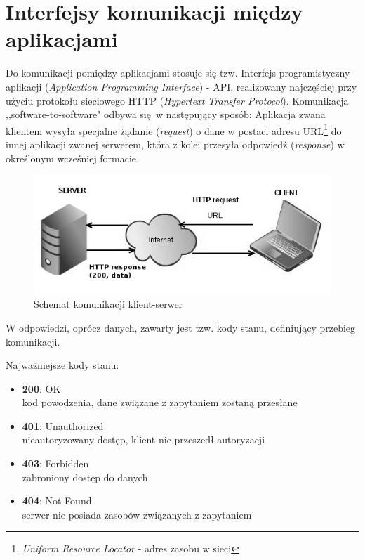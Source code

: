 \section{Interfejsy komunikacji między aplikacjami}
Do komunikacji pomiędzy aplikacjami stosuje się tzw. Interfejs programistyczny aplikacji (\emph{Application Programming Interface}) - API, realizowany najczęściej przy użyciu protokołu sieciowego HTTP (\emph{Hypertext Transfer Protocol}).
Komunikacja ,,software-to-software" odbywa się w następujący sposób:
Aplikacja zwana klientem wysyła specjalne żądanie (\emph{request}) o dane w postaci adresu URL\footnote{\emph{Uniform Resource Locator} - adres zasobu w sieci} do innej aplikacji zwanej serwerem, która z kolei przesyła odpowiedź (\emph{response}) w~ określonym wcześniej formacie.

\begin{figure}[h]
  \centering
  \includegraphics[scale=0.87]{images/http_communication.png}
  \caption{Schemat komunikacji klient-serwer}
\end{figure}

W odpowiedzi, oprócz danych, zawarty jest tzw. kody stanu, definiujący przebieg komunikacji.

Najważniejsze kody stanu:
 \begin{itemize}
     \item \textbf {200}: OK \\
     kod powodzenia, dane związane z zapytaniem zostaną przesłane
     \item \textbf {401}: Unauthorized \\
     nieautoryzowany dostęp, klient nie przeszedł autoryzacji
     \item \textbf {403}: Forbidden \\
     zabroniony dostęp do danych
     \item \textbf {404}: Not Found \\
     serwer nie posiada zasobów związanych z zapytaniem
  \end{itemize}

